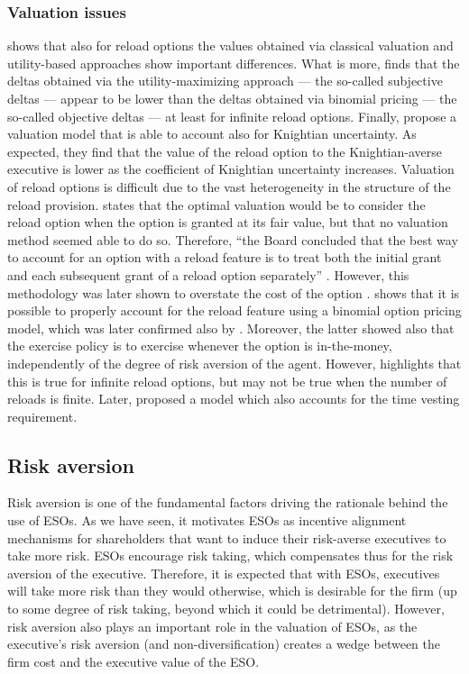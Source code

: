 \subsubsection{Valuation issues}
\citet{lau2005valuation} shows that also for reload options the values obtained via classical valuation and utility-based approaches show important differences. What is more, \citet{ingersoll2006valuing} finds that the deltas obtained via the utility-maximizing approach --- the so-called subjective deltas --- appear to be lower than the deltas obtained via binomial pricing --- the so-called objective deltas --- at least for infinite reload options. Finally, \citet{zhang2010knightian} propose a valuation model that is able to account also for Knightian uncertainty. As expected, they find that the value of the reload option to the Knightian-averse executive is lower as the coefficient of Knightian uncertainty increases.
Valuation of reload options is difficult due to the vast heterogeneity in the structure of the reload provision. \citet{fasb123} states that the optimal valuation would be to consider the reload option when the option is granted at its fair value, but that no valuation method seemed able to do so. Therefore, ``the Board concluded that the best way to account for an option with a reload feature is to treat both the initial grant and each subsequent grant of a reload option separately'' \citep{fasb123}. However, this methodology was later shown to overstate the cost of the option \citep{ingersoll2006valuing}. \citet{saly1999valuing} shows that it is possible to properly account for the reload feature using a binomial option pricing model, which was later confirmed also by \citet{hemmer2000reload}. Moreover, the latter showed also that the exercise policy is to exercise whenever the option is in-the-money, independently of the degree of risk aversion of the agent. However, \citet{saly1998ignoring} highlights that this is true for infinite reload options, but may not be true when the number of reloads is finite. Later, \citet{dai2005valuing} proposed a model which also accounts for the time vesting requirement.

\subsection{Risk aversion}
    Risk aversion is one of the fundamental factors driving the rationale behind the use of ESOs. As we have seen, it motivates ESOs as incentive alignment mechanisms for shareholders that want to induce their risk-averse executives to take more risk. ESOs encourage risk taking, which compensates thus for the risk aversion of the executive. Therefore, it is expected that with ESOs, executives will take more risk than they would otherwise, which is desirable for the firm (up to some degree of risk taking, beyond which it could be detrimental). However, risk aversion also plays an important role in the valuation of ESOs, as the executive's risk aversion (and non-diversification) creates a wedge between the firm cost and the executive value of the ESO.

